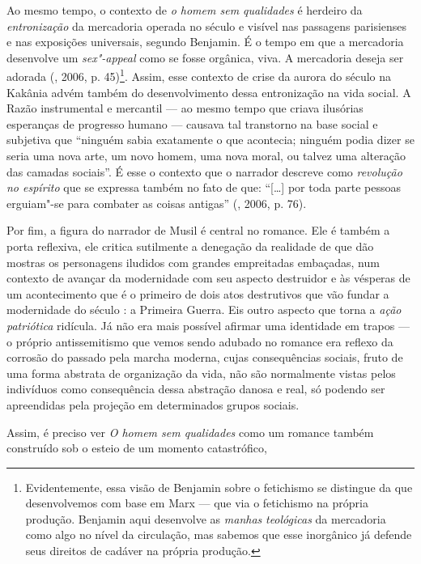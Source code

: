 Ao mesmo tempo, o contexto de \emph{o homem sem qualidades} é herdeiro
da \emph{entronização} da mercadoria operada no século  e visível nas
passagens parisienses e nas exposições universais, segundo Benjamin. É o
tempo em que a mercadoria desenvolve um \emph{sex"-appeal} como se fosse
orgânica, viva. A mercadoria deseja ser adorada (, 2006, p.
45)\footnote{Evidentemente, essa visão de Benjamin sobre o fetichismo se
  distingue da que desenvolvemos com base em Marx --- que via o
  fetichismo na própria produção. Benjamin aqui desenvolve as
  \emph{manhas} \emph{teológicas} da mercadoria como algo no nível da
  circulação, mas sabemos que esse inorgânico já defende seus direitos
  de cadáver na própria produção.}. Assim, esse contexto de crise da
aurora do século  na Kakânia advém também do desenvolvimento dessa
entronização na vida social. A Razão instrumental e mercantil --- ao
mesmo tempo que criava ilusórias esperanças de progresso humano ---
causava tal transtorno na base social e subjetiva que ``ninguém sabia
exatamente o que acontecia; ninguém podia dizer se seria uma nova arte,
um novo homem, uma nova moral, ou talvez uma alteração das camadas
sociais''. É esse o contexto que o narrador descreve como
\emph{revolução no espírito} que se expressa também no fato de que:
``[\ldots{}] por toda parte pessoas erguiam"-se para combater as coisas
antigas'' (, 2006, p. 76).

Por fim, a figura do narrador de Musil é central no romance. Ele é
também a porta reflexiva, ele critica sutilmente a denegação da
realidade de que dão mostras os personagens iludidos com grandes
empreitadas embaçadas, num contexto de avançar da modernidade com seu
aspecto destruidor e às vésperas de um acontecimento que é o primeiro de
dois atos destrutivos que vão fundar a modernidade do século : a
Primeira Guerra. Eis outro aspecto que torna a \emph{ação patriótica}
ridícula. Já não era mais possível afirmar uma identidade em trapos --- o
próprio antissemitismo que vemos sendo adubado no romance era reflexo da
corrosão do passado pela marcha moderna, cujas consequências sociais,
fruto de uma forma abstrata de organização da vida, não são normalmente
vistas pelos indivíduos como consequência dessa abstração danosa e real,
só podendo ser apreendidas pela projeção em determinados grupos sociais.

Assim, é preciso ver \emph{O homem sem qualidades} como um romance
também construído sob o esteio de um momento catastrófico,

